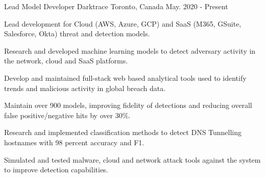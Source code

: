 

\begin{cventries}

  \cventry
    {Lead Model Developer} %
    {Darktrace} %
    {Toronto, Canada} %
    {May. 2020 - Present} %
    {
      \begin{cvitems} %
        \item {Lead development for Cloud (AWS, Azure, GCP) and SaaS (M365, GSuite, Salesforce, Okta) threat and detection models.}
        \item {Research and developed machine learning models to detect adversary activity in the network, cloud and SaaS platforms.}
        \item {Develop and maintained full-stack web based analytical tools used to identify trends and malicious activity in global breach data.}
        \item {Maintain over 900 models, improving fidelity of detections and reducing overall false positive/negative hits by over 30\%.}
        \item {Research and implemented classification methods to detect DNS Tunnelling hostnames with 98 percent accuracy and F1.}
        \item {Simulated and tested malware, cloud and network attack tools against the system to improve detection capabilities.}
      \end{cvitems}
    }


\end{cventries}
